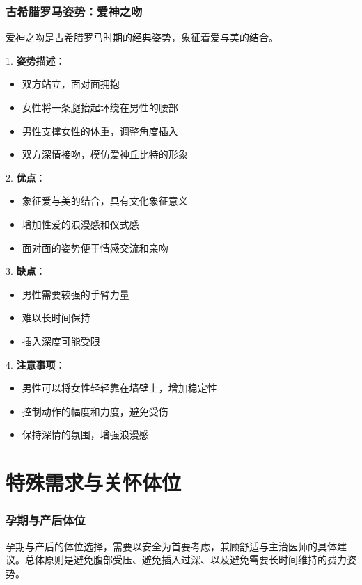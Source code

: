 \documentclass[12pt,UTF8]{ctexbook}
\begin{document}
\subsection{古希腊罗马姿势：爱神之吻}

爱神之吻是古希腊罗马时期的经典姿势，象征着爱与美的结合。

1. \textbf{姿势描述}：
  \begin{itemize}
  \item 双方站立，面对面拥抱
  \item 女性将一条腿抬起环绕在男性的腰部
  \item 男性支撑女性的体重，调整角度插入
  \item 双方深情接吻，模仿爱神丘比特的形象
  \end{itemize}

2. \textbf{优点}：
  \begin{itemize}
  \item 象征爱与美的结合，具有文化象征意义
  \item 增加性爱的浪漫感和仪式感
  \item 面对面的姿势便于情感交流和亲吻
  \end{itemize}

3. \textbf{缺点}：
  \begin{itemize}
  \item 男性需要较强的手臂力量
  \item 难以长时间保持
  \item 插入深度可能受限
  \end{itemize}

4. \textbf{注意事项}：
  \begin{itemize}
  \item 男性可以将女性轻轻靠在墙壁上，增加稳定性
  \item 控制动作的幅度和力度，避免受伤
  \item 保持深情的氛围，增强浪漫感
  \end{itemize}

\chapter{特殊需求与关怀体位}

\subsection{孕期与产后体位}

孕期与产后的体位选择，需要以安全为首要考虑，兼顾舒适与主治医师的具体建议。总体原则是避免腹部受压、避免插入过深、以及避免需要长时间维持的费力姿势。
\end{document}
